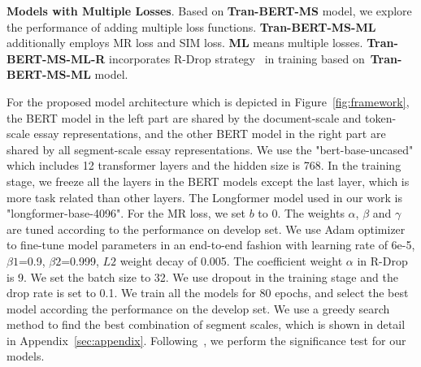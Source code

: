 \documentclass[11pt]{article}
\begin{document}
\begin{table}[h!]
\begin{center}
\end{center}
\caption{\label{font-t3} Experiment results of our model and the state-of-the-art models on ASAP long essays (WordPiece length are longer than 510). The name of our implemented model is in bold.}
\end{table}

\textbf{Models with Multiple Losses}.
Based on \textbf{Tran-BERT-MS} model, we explore the performance of adding multiple loss functions. \textbf{Tran-BERT-MS-ML} additionally employs MR loss and SIM loss.
\textbf{ML} means multiple losses.
\textbf{Tran-BERT-MS-ML-R} incorporates R-Drop strategy~\citep{Liang:2021} in training based on~\textbf{Tran-BERT-MS-ML} model. 
 




For the proposed model architecture which is depicted in Figure~\ref{fig:framework}, the BERT model in the left part are shared by the document-scale and token-scale essay representations,
and the other BERT model in the right part are shared by all segment-scale essay representations.
We use the "bert-base-uncased" which includes 12 transformer layers and the hidden size is 768.
In the training stage, we freeze all the layers in the BERT models except the last layer, which is more task related than other layers.
The Longformer model used in our work is "longformer-base-4096".
For the MR loss, we set $b$ to 0.
The weights $\alpha$, $\beta$ and $\gamma$ are tuned according to the performance on develop set.
We use Adam optimizer~\citep{Kingma:2015} to fine-tune model parameters in an end-to-end fashion with learning rate of 6e-5, $\beta1$=0.9, $\beta2$=0.999, $L2$ weight decay of 0.005.
The coefficient weight $\alpha$ in R-Drop is 9.
We set the batch size to 32.
We use dropout in the training stage and the drop rate is set to 0.1.
We train all the models for 80 epochs, and select the best model according the performance on the develop set.
We use a greedy search method to find the best combination of segment scales, which is shown in detail in Appendix~\ref{sec:appendix}.
Following~\citep{Cao:2020}, we perform the significance test for our models.
\end{document}
